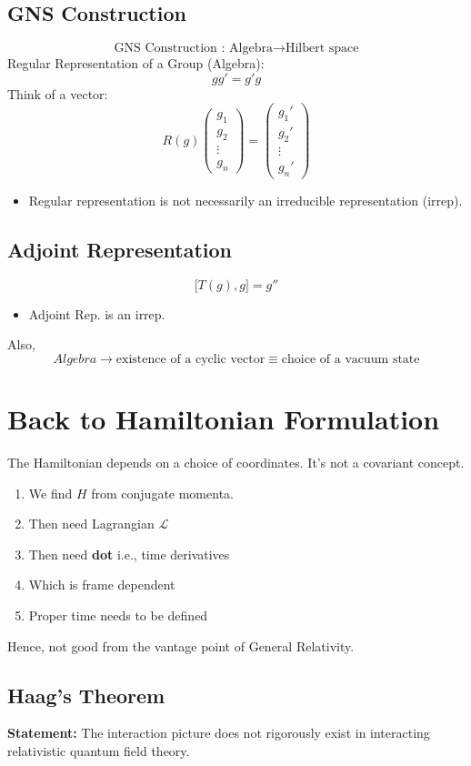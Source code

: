 \documentclass[14pt]{article} %
\begin{document}
\begin{tcolorbox}
\subsection*{GNS Construction}
\[\text{GNS Construction : Algebra} \rightarrow \text{Hilbert space} \]
Regular Representation of a Group (Algebra):
\[
gg' = g' g
\]
Think of a vector:
\[
R(g)
\begin{pmatrix}
g_1 \\
g_2 \\
\vdots \\
g_n
\end{pmatrix}
=
\begin{pmatrix}
g_1' \\
g_2' \\
\vdots \\
g_n'
\end{pmatrix}
\]
\begin{itemize}
    \item Regular representation is not necessarily an irreducible representation (irrep).
\end{itemize}

\subsection*{Adjoint Representation}
\[
\big[T(g), g\big] = g''
\]
\begin{itemize}
    \item Adjoint Rep. is an irrep.
\end{itemize}
Also,
\[Algebra \to \text{existence of a cyclic vector} \equiv \text{choice of a vacuum state}
\]
\end{tcolorbox}

\section*{Back to Hamiltonian Formulation}
The Hamiltonian depends on a choice of coordinates. It's not a covariant concept.

\begin{enumerate}
    \item We find \( H \) from conjugate momenta.
    \item Then need Lagrangian \( \mathcal{L} \)
    \item Then need \textbf{dot} i.e., time derivatives
    \item Which is frame dependent
    \item Proper time needs to be defined
\end{enumerate}
Hence, not good from the vantage point of General Relativity.
\begin{tcolorbox}
\subsection*{Haag's Theorem}
\textbf{Statement:} The interaction picture does not rigorously exist in interacting relativistic quantum field theory.
\end{tcolorbox}
\end{document}
